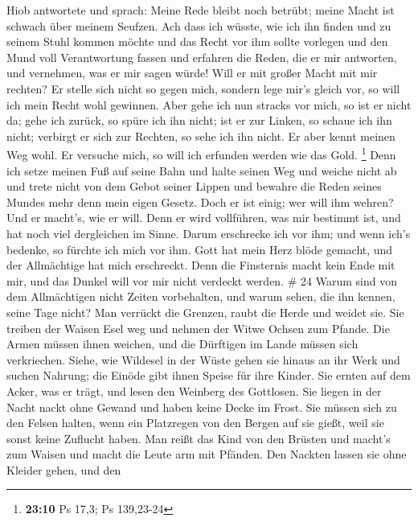  Hiob antwortete und sprach:  Meine Rede bleibt
noch betrübt; meine Macht ist schwach über meinem Seufzen. 
Ach dass ich wüsste, wie ich ihn finden und zu seinem Stuhl kommen
möchte  und das Recht vor ihm sollte vorlegen und den Mund
voll Verantwortung fassen  und erfahren die Reden, die er
mir antworten, und vernehmen, was er mir sagen würde!  Will
er mit großer Macht mit mir rechten? Er stelle sich nicht so gegen mich,
 sondern lege mir's gleich vor, so will ich mein Recht wohl
gewinnen.  Aber gehe ich nun stracks vor mich, so ist er
nicht da; gehe ich zurück, so spüre ich ihn nicht;  ist er
zur Linken, so schaue ich ihn nicht; verbirgt er sich zur Rechten, so
sehe ich ihn nicht.  Er aber kennt meinen Weg wohl. Er
versuche mich, so will ich erfunden werden wie das Gold. \footnote{\textbf{23:10}
  Ps 17,3; Ps 139,23-24}  Denn ich setze meinen Fuß auf
seine Bahn und halte seinen Weg und weiche nicht ab  und
trete nicht von dem Gebot seiner Lippen und bewahre die Reden seines
Mundes mehr denn mein eigen Gesetz.  Doch er ist einig; wer
will ihm wehren? Und er macht's, wie er will.  Denn er wird
vollführen, was mir bestimmt ist, und hat noch viel dergleichen im
Sinne.  Darum erschrecke ich vor ihm; und wenn ich's
bedenke, so fürchte ich mich vor ihm.  Gott hat mein Herz
blöde gemacht, und der Allmächtige hat mich erschreckt. 
Denn die Finsternis macht kein Ende mit mir, und das Dunkel will vor mir
nicht verdeckt werden. \# 24  Warum sind von dem
Allmächtigen nicht Zeiten vorbehalten, und warum sehen, die ihn kennen,
seine Tage nicht?  Man verrückt die Grenzen, raubt die Herde
und weidet sie.  Sie treiben der Waisen Esel weg und nehmen
der Witwe Ochsen zum Pfande.  Die Armen müssen ihnen
weichen, und die Dürftigen im Lande müssen sich verkriechen.
 Siehe, wie Wildesel in der Wüste gehen sie hinaus an ihr
Werk und suchen Nahrung; die Einöde gibt ihnen Speise für ihre Kinder.
 Sie ernten auf dem Acker, was er trägt, und lesen den
Weinberg des Gottlosen.  Sie liegen in der Nacht nackt ohne
Gewand und haben keine Decke im Frost.  Sie müssen sich zu
den Felsen halten, wenn ein Platzregen von den Bergen auf sie gießt,
weil sie sonst keine Zuflucht haben.  Man reißt das Kind von
den Brüsten und macht's zum Waisen und macht die Leute arm mit Pfänden.
 Den Nackten lassen sie ohne Kleider gehen, und den
